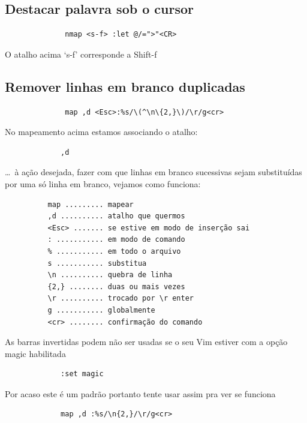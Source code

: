 \documentclass[10pt,a4paper,openany]{book}
\begin{document}
\subsection{Destacar palavra sob o cursor }
\label{Destacar palavra sob o cursor }

\begin{verbatim}
			  nmap <s-f> :let @/=">"<CR>
\end{verbatim}

O atalho acima `s-f' corresponde a Shift-f

\subsection{Remover linhas em branco duplicadas }
\label{Remover linhas em branco duplicadas }

\begin{verbatim}
			  map ,d <Esc>:%s/\(^\n\{2,}\)/\r/g<cr>
\end{verbatim}

No mapeamento acima estamos associando o atalho:

\begin{verbatim}
			 ,d
\end{verbatim}

\dots~à ação desejada, fazer com que linhas em branco sucessivas sejam
substituídas por uma só linha em branco, vejamos como funciona:

\begin{verbatim}
		  map ......... mapear
		  ,d .......... atalho que quermos
		  <Esc> ....... se estive em modo de inserção sai
		  : ........... em modo de comando
		  % ........... em todo o arquivo
		  s ........... substitua
		  \n .......... quebra de linha
		  {2,} ........ duas ou mais vezes
		  \r .......... trocado por \r enter
		  g ........... globalmente
		  <cr> ........ confirmação do comando
\end{verbatim}

As barras invertidas podem não ser usadas se o seu Vim estiver com a opção
magic habilitada

\begin{verbatim}
			 :set magic
\end{verbatim}

Por acaso este é um padrão portanto tente usar assim pra ver se funciona

\begin{verbatim}
			 map ,d :%s/\n{2,}/\r/g<cr>
\end{verbatim}
\end{document}
